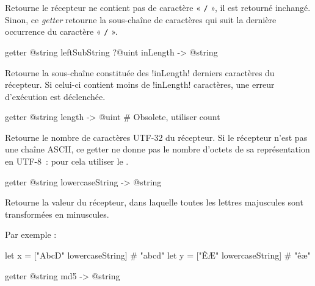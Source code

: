 Retourne le récepteur ne contient pas de caractère « \texttt{/} », il est retourné inchangé. Sinon, ce \emph{getter} retourne la sous-chaîne de caractères qui suit la dernière occurrence du caractère « \texttt{/} ».









\begin{galgas3box}
getter @string leftSubString ?@uint inLength -> @string
\end{galgas3box}

Retourne la sous-chaîne constituée des \ggst!inLength! derniers caractères du récepteur. Si celui-ci contient moins de \ggst!inLength! caractères, une erreur d'exécution est déclenchée.









\begin{galgas3box}
getter @string length -> @uint # Obsolete, utiliser count
\end{galgas3box}

Retourne le nombre de caractères UTF-32 du récepteur. Si le récepteur n'est pas une chaîne ASCII, ce getter ne donne pas le nombre d'octets de sa représentation en UTF-8~: pour cela utiliser le .









\begin{galgas3box}
getter @string lowercaseString -> @string
\end{galgas3box}

Retourne la valeur du récepteur, dans laquelle toutes les lettres majuscules sont transformées en minuscules.

Par exemple :
\begin{galgas3}
let x = ["AbcD" lowercaseString] # "abcd"
let y = ["ÊÆ" lowercaseString] # "êæ"
\end{galgas3}








\begin{galgas3box}
getter @string md5 -> @string
\end{galgas3box}

